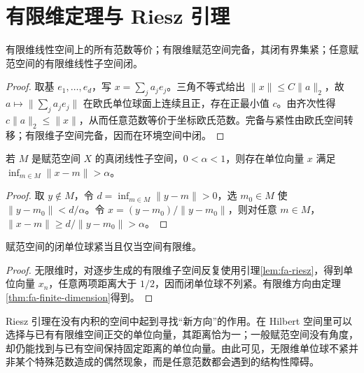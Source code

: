 \section{有限维定理与 Riesz 引理}
\begin{theorem}\label{thm:fa-finite-dimension}
有限维线性空间上的所有范数等价；有限维赋范空间完备，其闭有界集紧；任意赋范空间的有限维线性子空间闭。
\end{theorem}
\begin{proof}
取基 $e_1,\ldots,e_d$，写 $x=\sum_ja_je_j$。三角不等式给出 $\|x\|\leq C\|a\|_2$，故 $a\mapsto\|\sum_ja_je_j\|$ 在欧氏单位球面上连续且正，存在正最小值 $c$。由齐次性得 $c\|a\|_2\leq\|x\|$，从而任意范数等价于坐标欧氏范数。完备与紧性由欧氏空间转移；有限维子空间完备，因而在环境空间中闭。
\end{proof}
\begin{lemma}[Riesz 引理]\label{lem:fa-riesz}
若 $M$ 是赋范空间 $X$ 的真闭线性子空间，$0<\alpha<1$，则存在单位向量 $x$ 满足 $\inf_{m\in M}\|x-m\|>\alpha$。
\end{lemma}
\begin{proof}
取 $y\notin M$，令 $d=\inf_{m\in M}\|y-m\|>0$，选 $m_0\in M$ 使 $\|y-m_0\|<d/\alpha$。令 $x=(y-m_0)/\|y-m_0\|$，则对任意 $m\in M$，$\|x-m\|\geq d/\|y-m_0\|>\alpha$。
\end{proof}
\begin{corollary}\label{cor:fa-unit-ball}
赋范空间的闭单位球紧当且仅当空间有限维。
\end{corollary}
\begin{proof}
无限维时，对逐步生成的有限维子空间反复使用引理\ref{lem:fa-riesz}，得到单位向量 $x_n$，任意两项距离大于 $1/2$，因而闭单位球不列紧。有限维方向由定理\ref{thm:fa-finite-dimension}得到。
\end{proof}

Riesz 引理在没有内积的空间中起到寻找“新方向”的作用。在 Hilbert 空间里可以选择与已有有限维空间正交的单位向量，其距离恰为一；一般赋范空间没有角度，却仍能找到与已有空间保持固定距离的单位向量。由此可见，无限维单位球不紧并非某个特殊范数造成的偶然现象，而是任意范数都会遇到的结构性障碍。


